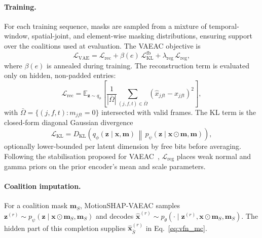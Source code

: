 \paragraph{Training.}
For each training sequence, masks are sampled from a mixture of temporal-window, spatial-joint, and element-wise masking distributions, ensuring support over the coalitions used at evaluation.  The VAEAC objective is
\begin{equation}
  \mathcal{L}_{\mathrm{VAE}}
  =
  \mathcal{L}_{\mathrm{rec}}
  +
  \beta(e)\,\mathcal{L}_{\mathrm{KL}}^{\mathrm{fb}}
  +
  \lambda_{\mathrm{reg}}\,\mathcal{L}_{\mathrm{reg}},
  \label{eq:loss_total}
\end{equation}
where $\beta(e)$ is annealed during training.  The reconstruction term is evaluated only on hidden, non-padded entries:
\begin{equation}
  \mathcal{L}_{\mathrm{rec}}
  =
  \mathbb{E}_{\mathbf{z}\sim q_\phi}
  \left[
    \frac{1}{|\bar{\Omega}|}
    \sum_{(j,f,t)\in\bar{\Omega}}
    \left(\hat{x}_{jft}-x_{jft}\right)^2
  \right],
  \label{eq:loss_rc}
\end{equation}
with $\bar{\Omega}=\{(j,f,t):m_{jft}=0\}$ intersected with valid frames.  The KL term is the closed-form diagonal Gaussian divergence
\begin{equation}
  \mathcal{L}_{\mathrm{KL}}
  =
  D_{\mathrm{KL}}\!\left(
  q_\phi(\mathbf{z}\mid\mathbf{x},\mathbf{m})
  \,\middle\|\,
  p_\psi(\mathbf{z}\mid\mathbf{x}\odot\mathbf{m},\mathbf{m})
  \right),
  \label{eq:loss_kl}
\end{equation}
optionally lower-bounded per latent dimension by free bits before averaging.  Following the stabilisation proposed for VAEAC~\citep{ivanov2018variational,olsen2022using}, $\mathcal{L}_{\mathrm{reg}}$ places weak normal and gamma priors on the prior encoder's mean and scale parameters.

\paragraph{Coalition imputation.}
For a coalition mask $\mathbf{m}_S$, MotionSHAP-VAEAC samples
$\mathbf{z}^{(r)}\sim p_\psi(\mathbf{z}\mid \mathbf{x}\odot\mathbf{m}_S,\mathbf{m}_S)$ and decodes
$\hat{\mathbf{x}}^{(r)}\sim p_\theta(\cdot\mid \mathbf{z}^{(r)},\mathbf{x}\odot\mathbf{m}_S,\mathbf{m}_S)$.  The hidden part of this completion supplies $\hat{\mathbf{x}}_{\bar S}^{(r)}$ in Eq.~\eqref{eq:vfn_mc}.

